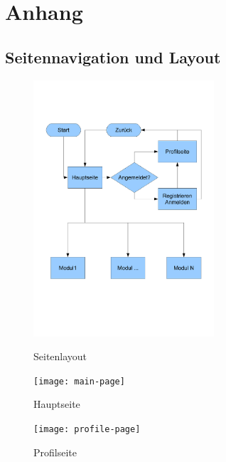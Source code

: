 \setcounter{section}{0}
\setcounter{subsection}{0}
\renewcommand*\thesection{\Alph{section}}

\chapter{Anhang}
\section{Seitennavigation und Layout}



\begin{figure}[!h]
  \centering
  \includegraphics[width=0.6\textwidth]{struktur}\\
  \caption{Seitenlayout}
  \label{fig:structure}
\end{figure}

\begin{figure}[!h]
  \centering
  \texttt{[image: main-page]}\\
  \caption{Hauptseite}
  \label{fig:main-page}
\end{figure}

\begin{figure}[!h]
  \centering
  \texttt{[image: profile-page]}\\
  \caption{Profilseite}
  \label{fig:profile-page}
\end{figure}

